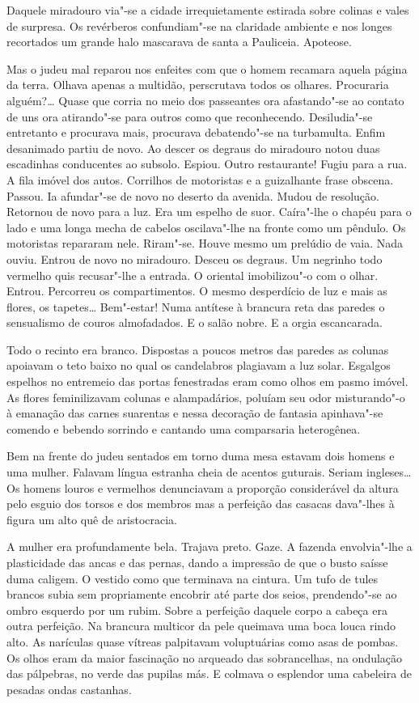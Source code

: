 Daquele miradouro via"-se a cidade irrequietamente estirada sobre colinas
e vales de surpresa. Os revérberos confundiam"-se na claridade ambiente e
nos longes recortados um grande halo mascarava de santa a Pauliceia.
Apoteose.

Mas o judeu mal reparou nos enfeites com que o homem recamara aquela
página da terra. Olhava apenas a multidão, perscrutava todos os olhares.
Procuraria alguém?\ldots{} Quase que corria no meio dos passeantes ora
afastando"-se ao contato de uns ora atirando"-se para outros como que
reconhecendo. Desiludia"-se entretanto e procurava mais, procurava
debatendo"-se na turbamulta. Enfim desanimado partiu de novo. Ao descer
os degraus do miradouro notou duas escadinhas conducentes ao subsolo.
Espiou. Outro restaurante! Fugiu para a rua. A fila imóvel dos autos.
Corrilhos de motoristas e a guizalhante frase obscena. Passou. Ia
afundar"-se de novo no deserto da avenida. Mudou de resolução. Retornou
de novo para a luz. Era um espelho de suor. Caíra"-lhe o chapéu para o
lado e uma longa mecha de cabelos oscilava"-lhe na fronte como um
pêndulo. Os motoristas repararam nele. Riram"-se. Houve mesmo um prelúdio
de vaia. Nada ouviu. Entrou de novo no miradouro. Desceu os degraus. Um
negrinho todo vermelho quis recusar"-lhe a entrada. O oriental
imobilizou"-o com o olhar. Entrou. Percorreu os compartimentos. O mesmo
desperdício de luz e mais as flores, os tapetes\ldots{} Bem"-estar! Numa
antítese à brancura reta das paredes o sensualismo de couros
almofadados. E o salão nobre. E a orgia escancarada.

Todo o recinto era branco. Dispostas a poucos metros das paredes as
colunas apoiavam o teto baixo no qual os candelabros plagiavam a luz
solar. Esgalgos espelhos no entremeio das portas fenestradas eram como
olhos em pasmo imóvel. As flores feminilizavam colunas e alampadários,
poluíam seu odor misturando"-o à emanação das carnes suarentas e nessa
decoração de fantasia apinhava"-se comendo e bebendo sorrindo e cantando
uma comparsaria heterogênea.

Bem na frente do judeu sentados em torno duma mesa estavam dois homens e
uma mulher. Falavam língua estranha cheia de acentos guturais. Seriam
ingleses\ldots{} Os homens louros e vermelhos denunciavam a proporção
considerável da altura pelo esguio dos torsos e dos membros mas a
perfeição das casacas dava"-lhes à figura um alto quê de aristocracia.

A mulher era profundamente bela. Trajava preto. Gaze. A fazenda
envolvia"-lhe a plasticidade das ancas e das pernas, dando a impressão de
que o busto saísse duma caligem. O vestido como que terminava na
cintura. Um tufo de tules brancos subia sem propriamente encobrir até
parte dos seios, prendendo"-se ao ombro esquerdo por um rubim. Sobre a
perfeição daquele corpo a cabeça era outra perfeição. Na brancura
multicor da pele queimava uma boca louca rindo alto. As narículas quase
vítreas palpitavam voluptuárias como asas de pombas. Os olhos eram da
maior fascinação no arqueado das sobrancelhas, na ondulação das
pálpebras, no verde das pupilas más. E colmava o esplendor uma cabeleira
de pesadas ondas castanhas.

